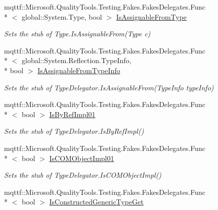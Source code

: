 \begin{DoxyCompactItemize}
mqttf\-::\-Microsoft.\-Quality\-Tools.\-Testing.\-Fakes.\-Fakes\-Delegates.\-Func\\*
$<$ global\-::\-System.\-Type, bool $>$ \hyperlink{class_system_1_1_reflection_1_1_fakes_1_1_stub_type_delegator_aa35a208a2f42d51e7c17755978c3dca0}{Is\-Assignable\-From\-Type}
\begin{DoxyCompactList}\small\item\em Sets the stub of Type.\-Is\-Assignable\-From(\-Type c)\end{DoxyCompactList}\item 
mqttf\-::\-Microsoft.\-Quality\-Tools.\-Testing.\-Fakes.\-Fakes\-Delegates.\-Func\\*
$<$ global\-::\-System.\-Reflection.\-Type\-Info, \\*
bool $>$ \hyperlink{class_system_1_1_reflection_1_1_fakes_1_1_stub_type_delegator_a21121b60fd75bdd56d3cfd4493e9efb0}{Is\-Assignable\-From\-Type\-Info}
\begin{DoxyCompactList}\small\item\em Sets the stub of Type\-Delegator.\-Is\-Assignable\-From(\-Type\-Info type\-Info)\end{DoxyCompactList}\item 
mqttf\-::\-Microsoft.\-Quality\-Tools.\-Testing.\-Fakes.\-Fakes\-Delegates.\-Func\\*
$<$ bool $>$ \hyperlink{class_system_1_1_reflection_1_1_fakes_1_1_stub_type_delegator_a174761d7926ef8b6c1fe858bd77e913d}{Is\-By\-Ref\-Impl01}
\begin{DoxyCompactList}\small\item\em Sets the stub of Type\-Delegator.\-Is\-By\-Ref\-Impl()\end{DoxyCompactList}\item 
mqttf\-::\-Microsoft.\-Quality\-Tools.\-Testing.\-Fakes.\-Fakes\-Delegates.\-Func\\*
$<$ bool $>$ \hyperlink{class_system_1_1_reflection_1_1_fakes_1_1_stub_type_delegator_a610e48f63a41bfcb2a89b971820af683}{Is\-C\-O\-M\-Object\-Impl01}
\begin{DoxyCompactList}\small\item\em Sets the stub of Type\-Delegator.\-Is\-C\-O\-M\-Object\-Impl()\end{DoxyCompactList}\item 
mqttf\-::\-Microsoft.\-Quality\-Tools.\-Testing.\-Fakes.\-Fakes\-Delegates.\-Func\\*
$<$ bool $>$ \hyperlink{class_system_1_1_reflection_1_1_fakes_1_1_stub_type_delegator_a4db81672b592704f95b71ca49240c680}{Is\-Constructed\-Generic\-Type\-Get}

\end{DoxyCompactItemize}
